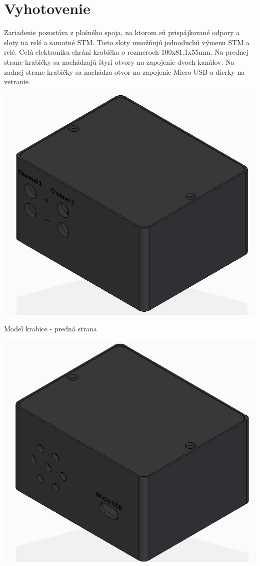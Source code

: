 \documentclass[main.tex]{subfiles}
\begin{document}
	\newpage
	\pagebreak
	\section{Vyhotovenie}
		\begin{multicols*}{2}
			\noindent Zariadenie pozostáva z plošného spoja, na ktorom sú prispájkované odpory a sloty na relé a samotné STM. Tieto sloty umožňujú jednoduchú výmenu STM a relé. Celú elektroniku chráni krabička o rozmeroch 100x81.1x55mm. Na prednej strane krabičky sa nachádzajú štyri otvory na zapojenie dvoch kanálov. Na zadnej strane krabičky sa nachádza otvor na zapojenie Micro USB a dierky na vetranie.
			
			\begin{figurehere}
				\centering
				\includegraphics[width=\linewidth]{../Obrazky/Box01}
				\caption{Model krabice - predná strana}
				\label{fig:krabicaPredok}
			\end{figurehere}
			\begin{figurehere}
				\centering
				\includegraphics[width=\linewidth]{../Obrazky/Box02}

\end{figurehere}
\end{multicols*}
\end{document}
